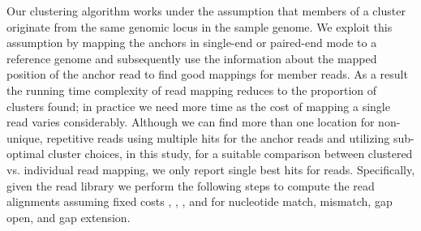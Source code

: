 \documentclass[a4paper]{article}
\begin{document}
Our clustering algorithm works under the assumption that
members of a cluster originate from the same genomic locus in the
sample genome. We exploit this assumption by mapping the anchors in
single-end or paired-end mode to a reference genome and subsequently
use the
information about the mapped position of the anchor read to find good
mappings for member reads. As a result the running time complexity of read
mapping reduces to the proportion of clusters found; in practice
we need more time
as the cost of mapping a single read varies
considerably.
Although we can find more than one location for non-unique, repetitive reads
using multiple hits for the anchor reads and utilizing sub-optimal cluster choices,
in this study, for a suitable comparison between clustered vs. individual
read mapping, we only report single best hits for reads.
Specifically, given the read library  we perform the
following steps to compute the read alignments assuming fixed costs
, , , and 
for nucleotide match, mismatch, gap open, and gap extension.
\end{document}
